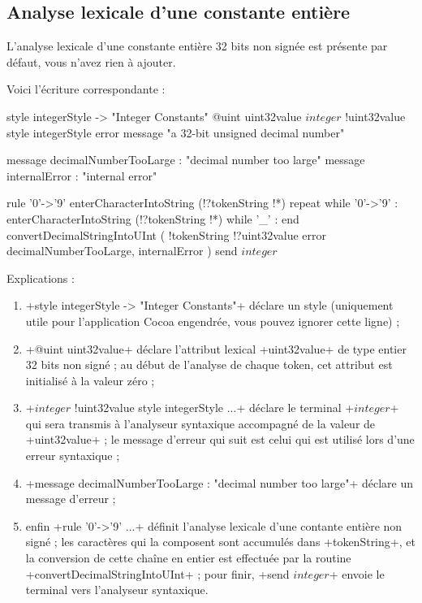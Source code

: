 \subsection{Analyse lexicale d'une constante entière}

L’analyse lexicale d’une constante entière 32 bits non signée est présente par défaut, vous n’avez rien à ajouter.

Voici l'écriture correspondante :
\begin{galgas}
style integerStyle -> "Integer Constants"
@uint uint32value
$integer$ !uint32value style integerStyle
               error message "a 32-bit unsigned decimal number"

message decimalNumberTooLarge : "decimal number too large"
message internalError : "internal error"

rule '0'->'9' {
  enterCharacterIntoString (!?tokenString !*)
  repeat
  while '0'->'9' :
    enterCharacterIntoString (!?tokenString !*)
  while '_' :
  end
  convertDecimalStringIntoUInt (
    !tokenString
    !?uint32value
    error decimalNumberTooLarge, internalError
  )
  send $integer$
}
\end{galgas}


Explications :
\begin{enumerate}
  \item \ggs+style integerStyle -> "Integer Constants"+ déclare un style (uniquement utile pour l’application Cocoa engendrée, vous pouvez ignorer cette ligne) ;
  \item \ggs+@uint uint32value+ déclare l’attribut lexical \ggs+uint32value+ de type entier 32 bits non signé ; au début de l’analyse de chaque token, cet attribut est initialisé à la valeur zéro ;
  \item \ggs+$integer$ !uint32value style integerStyle ...+ déclare le terminal \ggs+$integer$+ qui sera transmis à l’analyseur syntaxique accompagné de la valeur de \ggs+uint32value+ ;  le message d’erreur qui suit est celui qui est utilisé lors d’une erreur syntaxique ;
  \item \ggs+message decimalNumberTooLarge : "decimal number too large"+ déclare un message d’erreur ;
  \item enfin \ggs+rule '0'->'9' ...+ définit l’analyse lexicale d’une contante entière non signé ; les caractères qui la composent sont accumulés dans \ggs+tokenString+, et la conversion de cette chaîne en entier est effectuée par la routine \ggs+convertDecimalStringIntoUInt+ ; pour finir, \ggs+send $integer$+ envoie le terminal vers l’analyseur syntaxique.
\end{enumerate}

